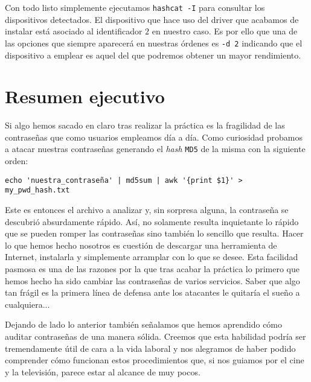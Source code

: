\documentclass{article}
\begin{document}

        Con todo listo simplemente ejecutamos \texttt{hashcat -I} para consultar los dispositivos detectados. El dispositivo que hace uso del driver que acabamos de instalar está asociado al identificador $2$ en nuestro caso. Es por ello que una de las opciones que siempre aparecerá en nuestras órdenes es \texttt{-d 2} indicando que el dispositivo a emplear es aquel del que podremos obtener un mayor rendimiento.

    \section{Resumen ejecutivo}
        Si algo hemos sacado en claro tras realizar la práctica es la fragilidad de las contraseñas que como usuarios empleamos día a día. Como curiosidad probamos a atacar nuestras contraseñas generando el \textit{hash} \texttt{MD5} de la misma con la siguiente orden:

        \begin{verbatim}
echo 'nuestra_contraseña' | md5sum | awk '{print $1}' > my_pwd_hash.txt
        \end{verbatim}

        Este es entonces el archivo a analizar y, sin sorpresa alguna, la contraseña se descubrió absurdamente rápido. Así, no solamente resulta inquietante lo rápido que se pueden romper las contraseñas sino también lo sencillo que resulta. Hacer lo que hemos hecho nosotros es cuestión de descargar una herramienta de Internet, instalarla y simplemente arramplar con lo que se desee. Esta facilidad pasmosa es una de las razones por la que tras acabar la práctica lo primero que hemos hecho ha sido cambiar las contraseñas de varios servicios. Saber que algo tan frágil es la primera línea de defensa ante los atacantes le quitaría el sueño a cualquiera...

        Dejando de lado lo anterior también señalamos que hemos aprendido cómo auditar contraseñas de una manera sólida. Creemos que esta habilidad podría ser tremendamente útil de cara a la vida laboral y nos alegramos de haber podido comprender cómo funcionan estos procedimientos que, si nos guiamos por el cine y la televisión, parece estar al alcance de muy pocos.
\end{document}
